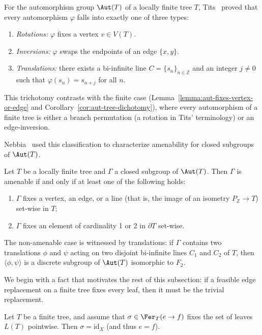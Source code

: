 For the automorphism group $\Aut(T)$ of a locally finite tree $T$, Tits~\cite{Tits_1970_AutT} proved that every automorphism $\varphi$ falls into exactly one of three types:
\begin{enumerate}
    \item \emph{Rotations:} $\varphi$ fixes a vertex $v\in V(T)$.
    \item \emph{Inversions:} $\varphi$ swaps the endpoints of an edge $\{x,y\}$.
    \item \emph{Translations:} there exists a bi-infinite line $C=\{s_n\}_{n\in\mathbb Z}$ and an integer $j\neq 0$ such that $\varphi(s_n)=s_{n+j}$ for all $n$.
\end{enumerate}
This trichotomy contrasts with the finite case (Lemma~\ref{lemma:aut-fixes-vertex-or-edge} and Corollary~\ref{cor:aut-tree-dichotomy}), where every automorphism of a finite tree is either a branch permutation (a rotation in Tits' terminology) or an edge-inversion.

Nebbia~\cite{Nebbia1988} used this classification to characterize amenability for closed subgroups of $\Aut(T)$.

\begin{theorem}\label{thm:nebbia}
    Let $T$ be a locally finite tree and $\Gamma$ a closed subgroup of $\Aut(T)$.
    Then $\Gamma$ is amenable if and only if at least one of the following holds:
    \begin{enumerate}
        \item $\Gamma$ fixes a vertex, an edge, or a line (that is, the image of an isometry $P_\mathbb Z\to T$) set-wise in $T$;
        \item $\Gamma$ fixes an element of cardinality 1 or 2 in $\partial T$ set-wise.
    \end{enumerate}
\end{theorem}

The non-amenable case is witnessed by translations: if $\Gamma$ contains two translations $\phi$ and $\psi$ acting on two disjoint bi-infinite lines $C_1$ and $C_2$ of $T$, then $\langle\phi,\psi\rangle$ is a discrete subgroup of $\Aut(T)$ isomorphic to $F_2$.

We begin with a fact that motivates the rest of this subsection: if a feasible edge replacement on a finite tree fixes every leaf, then it must be the trivial replacement.

\begin{lemma}\label{lemma:fer-fixing-all-leaves}
    Let $T$ be a finite tree, and assume that $\sigma\in\Fer_T(e\to f)$ fixes the set of leaves $L(T)$ pointwise.
    Then $\sigma = \mathrm{id}_X$ (and thus $e=f$).
\end{lemma}

